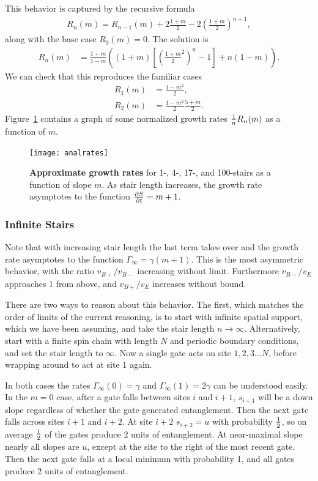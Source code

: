 This behavior is captured by the recursive formula
\begin{align}
R_n(m) = R_{n-1}(m)+2\frac{1+m}{2} - 2\left(\frac{1+m}{2}\right)^{n+1}, \label{eqn:raterecur}
\end{align}
along with the base case $R_0(m)=0$. The solution is
\begin{align}
R_n(m) &=\frac{1+m}{1-m}\left((1+m)\left[\left(\frac{1+m}{2}^2
	\right)^n-1\right]+n(1-m)\right).
\end{align}
We can check that this reproduces the familiar cases
\begin{align}
R_1(m) &= \frac{1-m^2}{2},\\
R_2(m) &= \frac{1-m^2}{2}\frac{5+m}{2}.
\end{align}
Figure~\ref{fig:growthrates} contains a graph of some normalized growth rates $\frac{1}{n}R_n(m)$ as a function of $m$.

\begin{figure}
	\centering
	\texttt{[image: analrates]}
	\caption{\textbf{Approximate growth rates} for 1-, 4-, 17-, and 100-stairs as a function of slope $m$. As stair length increases, the growth rate asymptotes to the function $\frac{\partial S}{\partial t} = m+1$.}
	\label{fig:growthrates}
\end{figure}

\subsubsection{Infinite Stairs}

Note that with increasing stair length the last term takes over and the growth rate asymptotes to the function $\Gamma_\infty = \gamma(m+1)$. This is the most asymmetric behavior, with the ratio $v_{B+}/v_{B-}$ increasing without limit. Furthermore $v_{B-}/v_E$ approaches 1 from above, and $v_{B+}/v_E$ increases without bound.

There are two ways to reason about this behavior. The first, which matches the order of limits of the current reasoning, is to start with infinite spatial support, which we have been assuming, and take the stair length $n\to\infty$. 
Alternatively, start with a finite spin chain with length $N$ and periodic boundary conditions, and set the stair length to $\infty$. Now a single gate acts on site $1,2,3\dots N$, before wrapping around to act at site 1 again. 

In both cases the rates $\Gamma_\infty(0)=\gamma$ and $\Gamma_\infty(1) = 2\gamma$ can be understood easily. In the $m=0$ case, after a gate falls between sites $i$ and $i+1$, $s_{i+1}$ will be a down slope regardless of whether the gate generated entanglement. Then the next gate falls across sites $i+1$ and $i+2$. At site $i+2$ $s_{i+2}=u$ with probability $\frac{1}{2}$, so on average $\frac{1}{2}$ of the gates produce 2 units of entanglement. At near-maximal slope nearly all slopes are $u$, except at the site to the right of the most recent gate. Then the next gate falls at a local minimum with probability 1, and all gates produce 2 units of entanglement.

